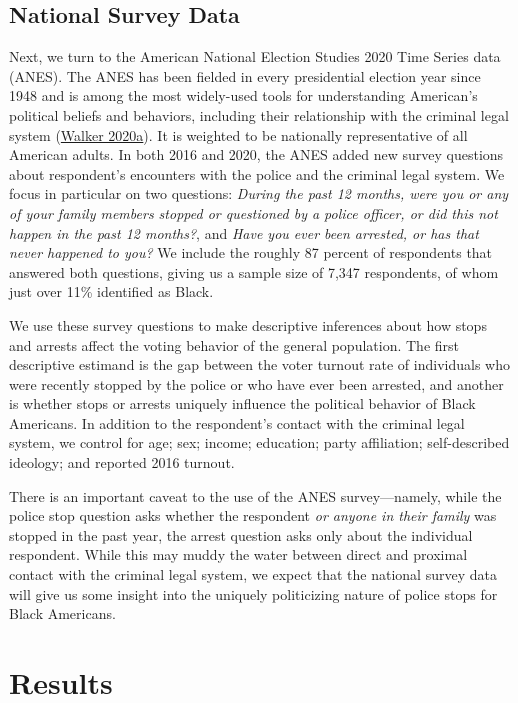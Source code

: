\documentclass[
  12pt,
]{article}
\begin{document}
\hypertarget{national-survey-data}{%
\subsection*{National Survey Data}\label{national-survey-data}}

Next, we turn to the American National Election Studies 2020 Time Series data (ANES). The ANES has been fielded in every presidential election year since 1948 and is among the most widely-used tools for understanding American's political beliefs and behaviors, including their relationship with the criminal legal system (\protect\hyperlink{ref-Walker2020}{Walker 2020a}). It is weighted to be nationally representative of all American adults. In both 2016 and 2020, the ANES added new survey questions about respondent's encounters with the police and the criminal legal system. We focus in particular on two questions: \emph{During the past 12 months, were you or any of your family members stopped or questioned by a police officer, or did this not happen in the past 12 months?}, and \emph{Have you ever been arrested, or has that never happened to you?} We include the roughly 87 percent of respondents that answered both questions, giving us a sample size of 7,347 respondents, of whom just over 11\% identified as Black.

We use these survey questions to make descriptive inferences about how stops and arrests affect the voting behavior of the general population. The first descriptive estimand is the gap between the voter turnout rate of individuals who were recently stopped by the police or who have ever been arrested, and another is whether stops or arrests uniquely influence the political behavior of Black Americans. In addition to the respondent's contact with the criminal legal system, we control for age; sex; income; education; party affiliation; self-described ideology; and reported 2016 turnout.

There is an important caveat to the use of the ANES survey---namely, while the police stop question asks whether the respondent \emph{or anyone in their family} was stopped in the past year, the arrest question asks only about the individual respondent. While this may muddy the water between direct and proximal contact with the criminal legal system, we expect that the national survey data will give us some insight into the uniquely politicizing nature of police stops for Black Americans.

\hypertarget{results}{%
\section*{Results}\label{results}}
\end{document}
